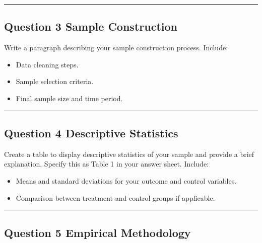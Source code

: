 \documentclass[paper=a4, fontsize=11pt]{scrartcl}
\newcommand{\horrule}[1]{\rule{\linewidth}{#1}}
\begin{document}
\bigskip\horrule{0.4pt}\bigskip


\subsection*{Question 3 \quad Sample Construction}

Write a paragraph describing your sample construction process. Include:
\begin{itemize}
  \item Data cleaning steps.
  \item Sample selection criteria.
  \item Final sample size and time period.
\end{itemize}

\bigskip\horrule{0.4pt}\bigskip


\subsection*{Question 4 \quad Descriptive Statistics}

Create a table to display descriptive statistics of your sample and provide a brief explanation. Specify this as Table 1 in your answer sheet. Include:
\begin{itemize}
  \item Means and standard deviations for your outcome and control variables.
  \item Comparison between treatment and control groups if applicable.
\end{itemize}

\bigskip\horrule{0.4pt}\bigskip


\subsection*{Question 5 \quad Empirical Methodology}
\end{document}
